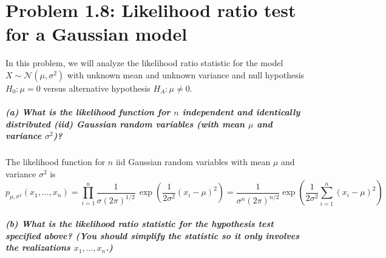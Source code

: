 \documentclass[11pt, english]{article}
\begin{document}
    
    \hypertarget{problem-1.8-likelihood-ratio-test-for-a-gaussian-model}{%
\section*{\texorpdfstring{\textbf{Problem 1.8:} Likelihood ratio test
for a Gaussian
model}{Problem 1.8: Likelihood ratio test for a Gaussian model}}\label{problem-1.8-likelihood-ratio-test-for-a-gaussian-model}}

In this problem, we will analyze the likelihood ratio statistic for the
model \(X \sim \mathcal{N}(\mu,\sigma^2)\) with unknown mean and unknown
variance and null hypothesis \(H_0 : \mu = 0\) versus alternative
hypothesis \(H_A : \mu \neq 0\).

    \hypertarget{a-what-is-the-likelihood-function-for-n-independent-and-identically-distributed-iid-gaussian-random-variables-with-mean-mu-and-variance-sigma2}{%
\subparagraph{\texorpdfstring{(a) What is the likelihood function for
\(n\) independent and identically distributed (iid) Gaussian random
variables (with mean \(\mu\) and variance
\(\sigma^2\))?}{(a) What is the likelihood function for n independent and identically distributed (iid) Gaussian random variables (with mean \textbackslash mu and variance \textbackslash sigma\^{}2)?}}\label{a-what-is-the-likelihood-function-for-n-independent-and-identically-distributed-iid-gaussian-random-variables-with-mean-mu-and-variance-sigma2}}

    The likelihood function for \(n\) iid Gaussian random variables with
mean \(\mu\) and variance \(\sigma^2\) is
\[p_{\mu, \sigma^2}(x_1, \ldots, x_n) = \prod_{i=1}^n \frac{1}{\sigma (2\pi)^{1/2}}\, \exp\left(\frac{1}{2\sigma^2}(x_i - \mu)^2\right) = \frac{1}{\sigma^n (2\pi)^{n/2}} \exp\left( \frac{1}{2\sigma^2} \sum_{i=1}^{n} (x_i- \mu)^2 \right) \]

    \hypertarget{b-what-is-the-likelihood-ratio-statistic-for-the-hypothesis-test-specified-above-you-should-simplify-the-statistic-so-it-only-involves-the-realizations-x_1-ldots-x_n.}{%
\subparagraph{\texorpdfstring{(b) What is the likelihood ratio statistic
for the hypothesis test specified above? (You should simplify the
statistic so it only involves the realizations
\(x_1, \ldots , x_n\).)}{(b) What is the likelihood ratio statistic for the hypothesis test specified above? (You should simplify the statistic so it only involves the realizations x\_1, \textbackslash ldots , x\_n.)}}\label{b-what-is-the-likelihood-ratio-statistic-for-the-hypothesis-test-specified-above-you-should-simplify-the-statistic-so-it-only-involves-the-realizations-x_1-ldots-x_n.}}
\end{document}

